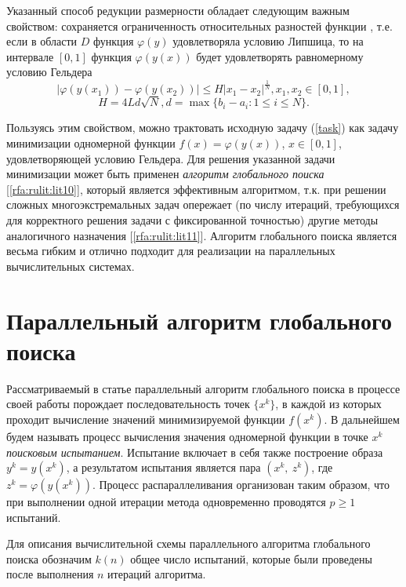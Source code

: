 \documentclass[10pt,a4paper]{book}
\begin{document}
Указанный способ редукции размерности обладает следующим важным свойством: сохраняется ограниченность относительных разностей функции , т.е. если в области $D$ функция $\varphi(y)$ удовлетворяла условию Липшица, то на интервале $[0,1]$ функция $\varphi(y(x))$ будет удовлетворять равномерному условию Гельдера
\begin{equation}
\label{holder}
\left|\varphi(y(x_1))-\varphi(y(x_2))\right|\leq H{\left|x_1-x_2\right|}^{\frac{1}{N}}, 
 x_1,x_2\in[0,1],
\end{equation}
\begin{equation}
H=4Ld\sqrt{N},d=\max\{b_i-a_i:1\leq i\leq N\}.
\end{equation}
 
Пользуясь этим свойством, можно трактовать исходную задачу (\ref{task}) как задачу минимизации одномерной функции $f\left(x\right)=\varphi\left(y\left(x\right)\right)$, $x\in[0,1]$, удовлетворяющей условию Гельдера. 
Для решения указанной задачи минимизации может быть применен \textit{алгоритм глобального поиска} [\ref{rfa:rulit:lit10}], который является эффективным алгоритмом, т.к. при решении сложных многоэкстремальных задач опережает (по числу итераций, требующихся для корректного решения задачи с фиксированной точностью) другие методы аналогичного назначения [\ref{rfa:rulit:lit11}].
Алгоритм глобального поиска является весьма гибким и отлично подходит для реализации на параллельных вычислительных системах.

\section{Параллельный алгоритм глобального поиска}

Рассматриваемый в статье параллельный алгоритм глобального поиска в процессе своей работы порождает последовательность точек $\{x^k\}$, в каждой из которых проходит вычисление значений минимизируемой функции $f(x^k)$. В дальнейшем будем называть процесс вычисления значения одномерной функции в точке $x^k$ \textit{поисковым испытанием}. Испытание включает в себя также построение образа $y^k=y(x^k)$, а результатом испытания является пара $(x^k,\ z^k)$, где $z^k=\varphi(y(x^k))$. Процесс распараллеливания организован таким образом, что при выполнении одной итерации метода одновременно проводятся $p\geq1$ испытаний. 

Для описания вычислительной схемы параллельного алгоритма глобального поиска обозначим $k(n)$ общее число испытаний, которые были проведены после выполнения $n$ итераций алгоритма. 
\end{document}
